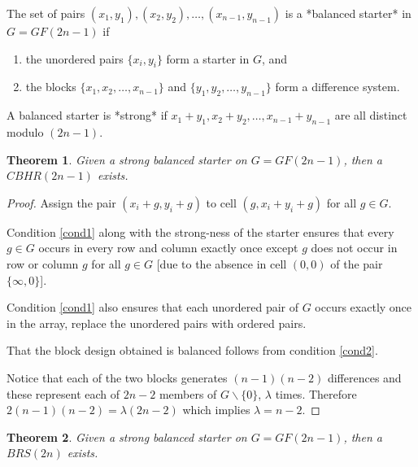 \documentclass[
  11pt,
  a4paper]{book}\usepackage[]{graphicx}\usepackage[]{xcolor}
\newtheorem{theorem}{Theorem}
\begin{document}
The set of pairs
$(x_1, y_1), (x_2, y_2), \ldots, (x_{n - 1}, y_{n - 1})$
is a *balanced starter* in $G = GF(2n - 1)$ if

\begin{enumerate}
  \item{the unordered pairs $\{x_i, y_i\}$ form a starter in
    $G$, and} \label{cond1}
  \item{the blocks $\{x_1, x_2, \ldots, x_{n - 1}\}$ and
    $\{y_1, y_2, \ldots, y_{n - 1}\}$ form a difference system.} \label{cond2}
\end{enumerate}

A balanced starter is *strong* if
$x_1 + y_1, x_2 + y_2, \ldots, x_{n - 1} + y_{n - 1}$ are
all distinct modulo $(2n - 1)$.

\begin{theorem}
Given a strong balanced starter on $G = GF(2n - 1)$, then
a $CBHR(2n - 1)$ exists.
\end{theorem}

\begin{proof}
Assign the pair $(x_i + g, y_i + g)$ to cell
$(g, x_i + y_i + g)$ for all $g \in G$.

Condition \ref{cond1} along with the strong-ness of
the starter ensures that every $g \in G$ occurs in every row
and column exactly once except $g$ does not occur in row or
column $g$ for all $g \in G$ [due to the absence in cell
$(0, 0)$ of the pair $\{\infty, 0\}$].

Condition \ref{cond1} also ensures that each unordered pair of $G$
occurs exactly once in the array, replace the unordered
pairs with ordered pairs.

That the block design obtained is balanced follows
from condition \ref{cond2}.

Notice that each of the two blocks
generates $(n - 1)(n - 2)$ differences and these represent each
of $2n - 2$ members of $G \backslash \{0\}$, $\lambda$ times.
Therefore $2(n - 1)(n - 2) = \lambda (2n - 2)$ which implies
$\lambda = n - 2$.
\end{proof}

\begin{theorem}
Given a strong balanced starter on $G = GF(2n - 1)$, then a
$BRS(2n)$ exists.
\end{theorem}
\end{document}
